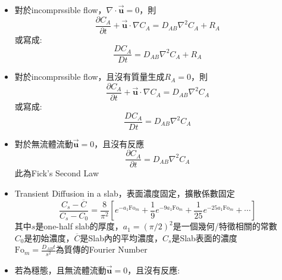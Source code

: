 \documentclass[../main.tex]{subfiles}
\begin{document}
\begin{itemize}
\begin{itemize}
  能量平衡式
  \begin{align}
    \frac{\partial C_i}{\partial t} + \nabla \cdot \vec{\bm N}_i - R_i &= 0 \nonumber\\
    \frac{\partial C_i}{\partial t} + \vec{\bm u} \cdot \nabla C_i - \mathbcal{D}_{is} \nabla^2 C_i - R_i &= 0
  \end{align}
  假設穩態，沒有反應
  \begin{equation}
    \boxed{\vec{\bm u} \cdot \nabla C_i = \mathbcal{D}_{is} \nabla^2 C_i} \label{eq:mass_transport_dilute_solution_steady_state}
  \end{equation}
    \item 對於incomprssible flow，$\nabla\cdot \vec {\bm u} = 0$，則
  \begin{equation}
    \frac{\partial C_A}{\partial t} + \vec {\bm u} \cdot \nabla C_A = D_{AB}\nabla^2 C_A +R_A
  \end{equation}
  或寫成:
  \begin{equation}
    \frac{DC_A}{Dt} = D_{AB}\nabla^2 C_A +R_A
  \end{equation}
  \item 對於incomprssible flow，且沒有質量生成$R_A=0$，則
  \begin{equation}
    \frac{\partial C_A}{\partial t} + \vec {\bm u} \cdot \nabla C_A = D_{AB}\nabla^2 C_A
  \end{equation}
  或寫成:
  \begin{equation}
    \frac{DC_A}{Dt} = D_{AB}\nabla^2 C_A
  \end{equation}
  \item {}對於無流體流動$\vec {\bm u}=0$，且沒有反應
  \begin{equation}
    \frac{\partial C_A}{\partial t} = D_{AB}\nabla^2 C_A
  \end{equation}
  此為Fick's Second Law
  \item Transient Diffusion in a slab，表面濃度固定，擴散係數固定
  \begin{equation}
    \frac{C_s-\overline{C}}{C_s - C_0} = \frac{8}{\pi^2}\left[
      e^{-a_1\text{Fo}_m} + \frac{1}{9}e^{-9a_1\text{Fo}_m} + \frac{1}{25}e^{-25a_1\text{Fo}_m} + \cdots
    \right]
  \end{equation}
  其中$s$是one-half slab的厚度，$a_1=(\pi/2)^2$是一個幾何/特徵相關的常數\\
  $C_0$是初始濃度，$\overline{C}$是Slab內的平均濃度，$C_s$是Slab表面的濃度\\
  $\text{Fo}_m = \frac{D_{AB} t}{s^2}$為質傳的Fourier Number
  \item 若為穩態，且無流體流動$\vec {\bm u}=0$，且沒有反應:

\end{itemize}
\end{itemize}
\end{document}
